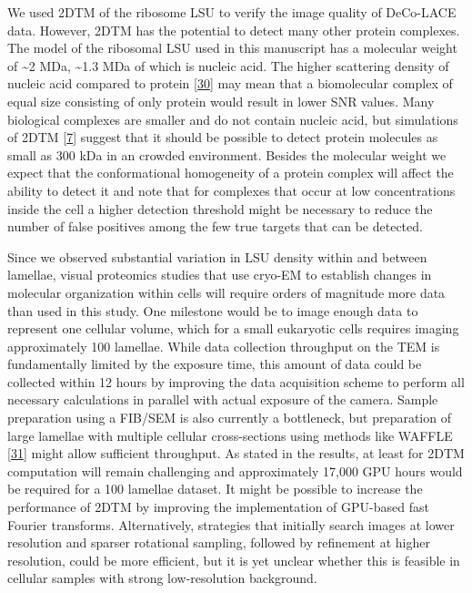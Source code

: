 \documentclass[
]{article}
\begin{document}
We used 2DTM of the ribosome LSU to verify the image quality of
DeCo-LACE data. However, 2DTM has the potential to detect many other
protein complexes. The model of the ribosomal LSU used in this
manuscript has a molecular weight of \textasciitilde2 MDa, \textasciitilde1.3 MDa of which is
nucleic acid. The higher scattering density of nucleic acid compared to
protein {[}\protect\hyperlink{ref-13fhsbtxo}{30}{]} may mean that a biomolecular complex of equal
size consisting of only protein would result in lower SNR values. Many
biological complexes are smaller and do not contain nucleic acid, but
simulations of 2DTM {[}\protect\hyperlink{ref-Ynb3IP6I}{7}{]} suggest that it should be
possible to detect protein molecules as small as 300 kDa in an crowded
environment. Besides the molecular weight we expect that the
conformational homogeneity of a protein complex will affect the ability
to detect it and note that for complexes that occur at low
concentrations inside the cell a higher detection threshold might be
necessary to reduce the number of false positives among the few true
targets that can be detected.

Since we observed substantial variation in LSU density within and
between lamellae, visual proteomics studies that use cryo-EM to
establish changes in molecular organization within cells will require
orders of magnitude more data than used in this study. One milestone
would be to image enough data to represent one cellular volume, which
for a small eukaryotic cells requires imaging approximately 100
lamellae. While data collection throughput on the TEM is fundamentally
limited by the exposure time, this amount of data could be collected
within 12 hours by improving the data acquisition scheme to perform all
necessary calculations in parallel with actual exposure of the camera.
Sample preparation using a FIB/SEM is also currently a bottleneck, but
preparation of large lamellae with multiple cellular cross-sections
using methods like WAFFLE {[}\protect\hyperlink{ref-17H2LWiIu}{31}{]} might allow
sufficient throughput. As stated in the results, at least for 2DTM
computation will remain challenging and approximately 17,000 GPU hours
would be required for a 100 lamellae dataset. It might be possible to
increase the performance of 2DTM by improving the implementation of
GPU-based fast Fourier transforms. Alternatively, strategies that
initially search images at lower resolution and sparser rotational
sampling, followed by refinement at higher resolution, could be more
efficient, but it is yet unclear whether this is feasible in cellular
samples with strong low-resolution background.
\end{document}
